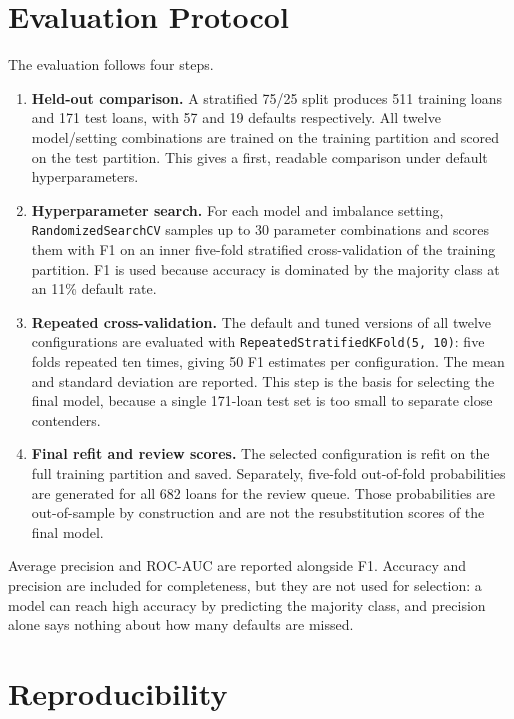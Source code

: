 \section{Evaluation Protocol}
\label{sec:evaluation-protocol}

The evaluation follows four steps.

\begin{enumerate}
    \item \textbf{Held-out comparison.} A stratified 75/25 split produces 511 training loans and 171 test loans, with 57 and 19 defaults respectively. All twelve model/setting combinations are trained on the training partition and scored on the test partition. This gives a first, readable comparison under default hyperparameters.
    \item \textbf{Hyperparameter search.} For each model and imbalance setting, \texttt{RandomizedSearchCV} samples up to 30 parameter combinations and scores them with F1 on an inner five-fold stratified cross-validation of the training partition. F1 is used because accuracy is dominated by the majority class at an 11\% default rate.
    \item \textbf{Repeated cross-validation.} The default and tuned versions of all twelve configurations are evaluated with \texttt{RepeatedStratifiedKFold(5, 10)}: five folds repeated ten times, giving 50 F1 estimates per configuration. The mean and standard deviation are reported. This step is the basis for selecting the final model, because a single 171-loan test set is too small to separate close contenders.
    \item \textbf{Final refit and review scores.} The selected configuration is refit on the full training partition and saved. Separately, five-fold out-of-fold probabilities are generated for all 682 loans for the review queue. Those probabilities are out-of-sample by construction and are not the resubstitution scores of the final model.
\end{enumerate}

Average precision and ROC-AUC are reported alongside F1. Accuracy and precision are included for completeness, but they are not used for selection: a model can reach high accuracy by predicting the majority class, and precision alone says nothing about how many defaults are missed.

\section{Reproducibility}
\label{sec:reproducibility}

